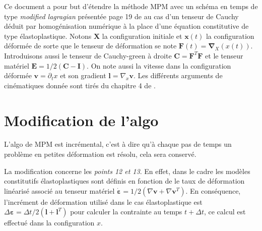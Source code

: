 \documentclass[12pt]{article}
\begin{document}
Ce document a pour but d'étendre la méthode MPM avec un schéma en temps de type \emph{modified lagragian} présentée page 19 
de \cite{Gra-2018} au cas d'un tenseur de Cauchy déduit par homogénisation numérique à la place d'une équation constitutive
de type élastoplastique.
Notons $\boldsymbol X$ la configuration initiale et $\boldsymbol x(t)$ la configuration déformée de sorte que le tenseur de déformation se note
$\boldsymbol F(t)=\boldsymbol\nabla_X(x(t))$. Introduisons aussi le tenseur de Cauchy-green à droite 
$\boldsymbol C=\boldsymbol F^T\boldsymbol F$ et le tenseur matériel $\boldsymbol E=1/2(\boldsymbol C- \boldsymbol I)$.
On note aussi la vitesse dans la configuration déformée $\boldsymbol v=\partial_t x$ 
et son gradient $\boldsymbol l=\nabla_x\boldsymbol v$. 
Les différents arguments de cinématiques donnée sont tirés du chapitre 4 de \cite{BonWoo-2008}.

\section{Modification de l'algo}
L'algo de MPM est incrémental, c'est à dire qu'à chaque pas de temps un problème en petites déformation est résolu, cela sera conservé. 

La modification concerne les \emph{points 12 et 13}. En effet, dans le cadre les modèles constitutifs élastoplastiques sont
définis en fonction de le taux de déformation linéarisé associé au tenseur matériel 
$\boldsymbol{\dot\varepsilon}=1/2(\nabla \boldsymbol v+\nabla \boldsymbol v^T)$. En conséquence, l'incrément de déformation utilisé
dans le cas élastoplastique est $\Delta \boldsymbol \varepsilon=\Delta t/2(\boldsymbol l+\boldsymbol l^T)$ pour calculer la contrainte au temps
$t+\Delta t$, ce calcul est effectué dans la configuration $x$.
\end{document}
